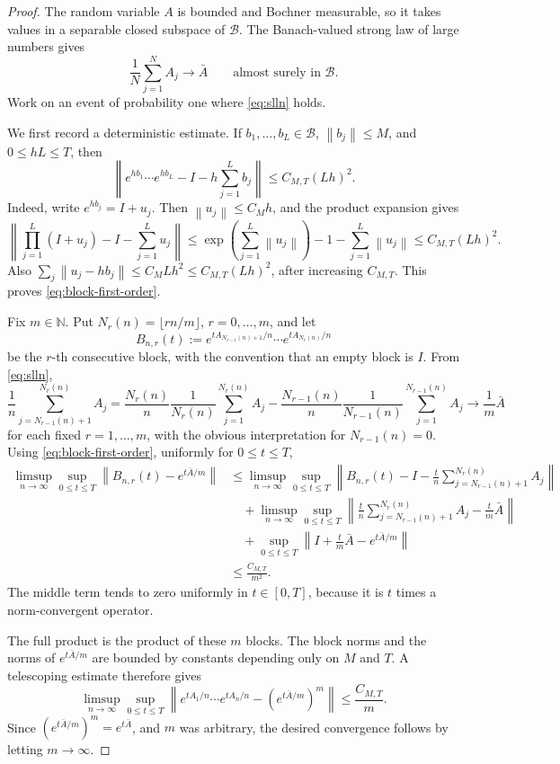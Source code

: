 \documentclass[11pt]{article}
\newcommand{\N}{\mathbb N}
\newcommand{\calB}{\mathcal B}
\newcommand{\norm}[1]{\left\lVert #1\right\rVert}
\begin{document}
\begin{proof}
The random variable \(A\) is bounded and Bochner measurable, so it takes values in a separable closed subspace of \(\calB\).  The Banach-valued strong law of large numbers gives
\begin{equation}\label{eq:slln}
  \frac1N\sum_{j=1}^N A_j \longrightarrow \bar A
  \qquad\text{almost surely in }\calB.
\end{equation}
Work on an event of probability one where \eqref{eq:slln} holds.

We first record a deterministic estimate.  If \(b_1,\ldots,b_L\in\calB\), \(\norm{b_j}\le M\), and \(0\le hL\le T\), then
\begin{equation}\label{eq:block-first-order}
  \norm{
    e^{hb_1}\cdots e^{hb_L}
    -
    I-h\sum_{j=1}^L b_j
  }
  \le C_{M,T}(Lh)^2 .
\end{equation}
Indeed, write \(e^{hb_j}=I+u_j\).  Then \(\norm{u_j}\le C_M h\), and the product expansion gives
\[
  \norm{\prod_{j=1}^L(I+u_j)-I-\sum_{j=1}^L u_j}
  \le
  \exp\left(\sum_{j=1}^L\norm{u_j}\right)-1-\sum_{j=1}^L\norm{u_j}
  \le C_{M,T}(Lh)^2.
\]
Also \(\sum_j\norm{u_j-hb_j}\le C_M Lh^2\le C_{M,T}(Lh)^2\), after increasing \(C_{M,T}\).  This proves \eqref{eq:block-first-order}.

Fix \(m\in\N\).  Put \(N_r(n)=\lfloor rn/m\rfloor\), \(r=0,\ldots,m\), and let
\[
  B_{n,r}(t)
  :=
  e^{tA_{N_{r-1}(n)+1}/n}
  \cdots
  e^{tA_{N_r(n)}/n}
\]
be the \(r\)-th consecutive block, with the convention that an empty block is \(I\).  From \eqref{eq:slln},
\[
  \frac1n\sum_{j=N_{r-1}(n)+1}^{N_r(n)} A_j
  =
  \frac{N_r(n)}{n}\frac1{N_r(n)}\sum_{j=1}^{N_r(n)}A_j
  -
  \frac{N_{r-1}(n)}{n}\frac1{N_{r-1}(n)}\sum_{j=1}^{N_{r-1}(n)}A_j
  \longrightarrow
  \frac1m\bar A
\]
for each fixed \(r=1,\ldots,m\), with the obvious interpretation for \(N_{r-1}(n)=0\).
Using \eqref{eq:block-first-order}, uniformly for \(0\le t\le T\),
\begin{align*}
  \limsup_{n\to\infty}
  \sup_{0\le t\le T}
  \norm{B_{n,r}(t)-e^{t\bar A/m}}
  &\le
  \limsup_{n\to\infty}
  \sup_{0\le t\le T}
  \norm{
    B_{n,r}(t)-I-\frac{t}{n}\sum_{j=N_{r-1}(n)+1}^{N_r(n)}A_j
  } \\
  &\quad+
  \limsup_{n\to\infty}
  \sup_{0\le t\le T}
  \norm{
    \frac{t}{n}\sum_{j=N_{r-1}(n)+1}^{N_r(n)}A_j-\frac{t}{m}\bar A
  } \\
  &\quad+
  \sup_{0\le t\le T}
  \norm{I+\frac{t}{m}\bar A-e^{t\bar A/m}} \\
  &\le \frac{C_{M,T}}{m^2}.
\end{align*}
The middle term tends to zero uniformly in \(t\in[0,T]\), because it is \(t\) times a norm-convergent operator.

The full product is the product of these \(m\) blocks.  The block norms and the norms of \(e^{t\bar A/m}\) are bounded by constants depending only on \(M\) and \(T\).  A telescoping estimate therefore gives
\[
  \limsup_{n\to\infty}
  \sup_{0\le t\le T}
  \norm{
    e^{tA_1/n}\cdots e^{tA_n/n}
    -
    \left(e^{t\bar A/m}\right)^m
  }
  \le \frac{C_{M,T}}{m}.
\]
Since \(\left(e^{t\bar A/m}\right)^m=e^{t\bar A}\), and \(m\) was arbitrary, the desired convergence follows by letting \(m\to\infty\).
\end{proof}
\end{document}
